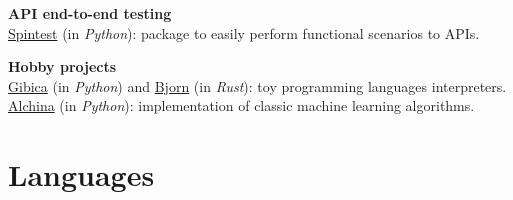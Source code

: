 \documentclass[11pt,a4paper,sans]{moderncv} %
\begin{document}
\vspace{+0.25cm}
\textbf{API end-to-end testing}\\
\href{https://github.com/societe-generale/spintest}{Spintest} (in \emph{Python}): package to easily perform functional scenarios to APIs.

\vspace{+0.25cm}
\textbf{Hobby projects}\\
\href{https://github.com/matthieugouel/gibica}{Gibica} (in \emph{Python}) and \href{https://github.com/matthieugouel/bjorn}{Bjorn} (in \emph{Rust}): toy programming languages interpreters. \\
\href{https://github.com/matthieugouel/alchina}{Alchina} (in \emph{Python}): implementation of classic machine learning algorithms.





\section{Languages}

\end{document}
